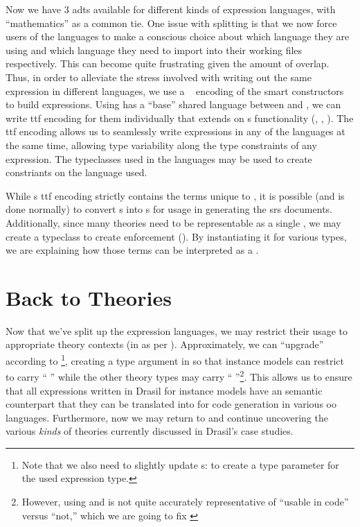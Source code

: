 Now we have 3 \acsp{adt} available for different kinds of expression languages,
with ``mathematics'' as a common tie. One issue with splitting is that we now
force users of the languages to make a conscious choice about which language
they are using and which language they need to import into their working files
respectively. This can become quite frustrating given the amount of overlap.
Thus, in order to alleviate the stress involved with writing out the same
expression in different languages, we use a ~\cite{Carette2009}
encoding of the smart constructors to build expressions. Using \Expr{} has a
``base'' shared language between \ModelExpr{} and \CodeExpr{}, we can write
\acs{ttf} encoding for them individually that extends on \Expr{}s functionality
(, ,
). The \acs{ttf} encoding allows us to seamlessly
write expressions in any of the languages at the same time, allowing type
variability along the type constraints of any expression. The typeclasses used
in the languages may be used to create constriants on the language used.

While \ModelExpr{}s \acs{ttf} encoding strictly contains the terms unique to
\ModelExpr{}, it is possible (and is done normally) to convert \Expr{}s into
\ModelExpr{}s for usage in generating the \acs{srs} documents. Additionally,
since many theories need to be representable as a single \Relation{}, we may
create a typeclass to create enforcement (). By
instantiating it for various types, we are explaining how those terms can be
interpreted as a \ModelExpr{}.

\currentExpressHaskell{}
 
\section{Back to Theories}
\label{chap:lang-division:sec:back-to-theories}

Now that we've split up the expression languages, we may restrict their usage to
appropriate theory contexts (in \ModelKinds{} as per ).
Approximately, we can ``upgrade'' \ModelKinds according to
\footnote{Note that we also need to slightly
update \QDefinition{}s:  to create a type
parameter for the used expression type.}, creating a type argument in
\ModelKinds{} so that instance models can restrict to carry ``\ModelKinds{}
\Expr{}'' while the other theory types may carry ``\ModelKinds{}
\ModelExpr{}''\footnote{However, using \Expr{} and \ModelExpr{} is not quite
accurately representative of ``usable in code'' versus ``not,'' which we are
going to fix \cite{DrasilIssue2853AlternativeModelKinds}}. This allows us to
ensure that all expressions written in Drasil for instance models have an
semantic counterpart that they can be translated into for code generation in
various \acs{oo} languages. Furthermore, now we may return to \ModelKinds{} and
continue uncovering the various \textit{kinds} of theories currently discussed
in Drasil's case studies.

\pseudoPartialModelKindsUpgrade{}

